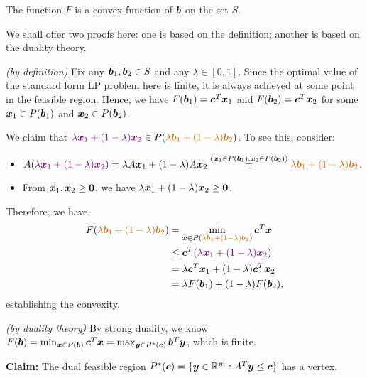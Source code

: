 \begin{enumerate}
\begin{theorem}
\label{thm:F-cvx}
The function \(F\) is a convex function of \(\bm{b}\) on the set \(S\).
\end{theorem}
We shall offer two proofs here: one is based on the definition; another is
based on the duality theory.

\begin{pf}
\emph{(by definition)}
Fix any \(\bm{b}_1,\bm{b}_2\in S\) and any \(\lambda\in[0,1]\). Since the
optimal value of the standard form LP problem here is finite, it is always
achieved at some point in the feasible region. Hence, we have
\(F(\bm{b}_1)=\bm{c}^{T}\bm{x}_1\) and
\(F(\bm{b}_2)=\bm{c}^{T}\bm{x}_2\) for some \(\bm{x}_1\in
P(\bm{b}_1)\) and \(\bm{x}_2\in P(\bm{b}_2)\).

We claim that \(\vc{\lambda\vect{x}_1+(1-\lambda)\vect{x}_2}\in
P(\orc{\lambda\vect{b}_1+(1-\lambda)\vect{b}_2})\). To see this, consider:
\begin{itemize}
\item \(A(\vc{\lambda\vect{x}_1+(1-\lambda)\vect{x}_2})
=\lambda A\vect{x}_1+(1-\lambda)A\vect{x}_2
\overset{(\vect{x}_1\in P(\vect{b}_1), \vect{x}_2\in P(\vect{b}_2))}{=}\orc{\lambda\vect{b}_1+(1-\lambda)\vect{b}_2}\).
\item From \(\bm{x}_1,\bm{x}_2\ge \bm{0}\), we have \(\lambda\bm{x}_1+(1-\lambda)\bm{x}_2\ge\bm{0}\).
\end{itemize}
Therefore, we have
\begin{align*}
F(\orc{\lambda\vect{b}_1+(1-\lambda)\vect{b}_2})
&=\min_{\vect{x}\in P(\orc{\lambda\vect{b}_1+(1-\lambda)\vect{b}_2})}\vect{c}^{T}\vect{x} \\
&\le\vect{c}^{T}(\vc{\lambda\vect{x}_1+(1-\lambda)\vect{x}_2}) \\
&=\lambda\vect{c}^{T}\vect{x}_1+(1-\lambda)\vect{c}^{T}\vect{x}_2 \\
&=\lambda F(\vect{b}_{1})+(1-\lambda)F(\vect{b}_{2}),
\end{align*}
establishing the convexity.
\end{pf}

\begin{pf}
\emph{(by duality theory)}
By strong duality, we know \(F(\bm{b})=\min_{\bm{x}\in P(\bm{b})}\bm{c}^{T}\bm{x}
=\max_{\bm{y}\in P^*(\bm{c})}\bm{b}^{T}\bm{y}\), which is finite.

\textbf{Claim:} The dual feasible region
\(P^*(\bm{c})=\{\bm{y}\in\mathbb{R}^m:A^{T}\bm{y}\le\bm{c}\}\) has a vertex.


\end{pf}
\end{enumerate}
